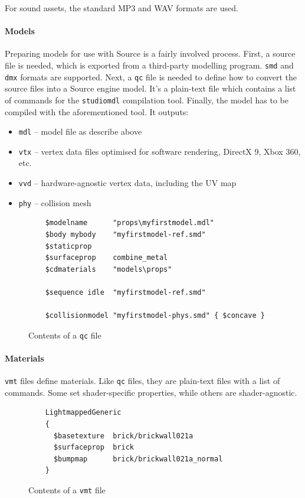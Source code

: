 \documentclass[a4paper, 12pt]{scrartcl}
\begin{document}
For sound assets, the standard MP3 and WAV formats are used.

\paragraph{Models}
Preparing models for use with Source is a fairly involved process. First, a source file is needed, which is exported from a third-party modelling program. \texttt{smd} and \texttt{dmx} formats are supported. Next, a \texttt{qc} file is needed to define how to convert the source files into a Source engine model. It's a plain-text file which contains a list of commands for the \texttt{studiomdl} compilation tool. Finally, the model has to be compiled with the aforementioned tool. It outputs:

\begin{itemize}
  \item \texttt{mdl} -- model file as describe above
  \item \texttt{vtx} -- vertex data files optimised for software rendering, DirectX 9, Xbox 360, etc.
  \item \texttt{vvd} -- hardware-agnostic vertex data, including the UV map
  \item \texttt{phy} -- collision mesh
\end{itemize}

\begin{figure}[!ht]
  \begin{verbatim}
    $modelname      "props\myfirstmodel.mdl"
    $body mybody    "myfirstmodel-ref.smd"
    $staticprop
    $surfaceprop    combine_metal
    $cdmaterials    "models\props"

    $sequence idle  "myfirstmodel-ref.smd"

    $collisionmodel "myfirstmodel-phys.smd" { $concave }
  \end{verbatim}
  \caption{Contents of a \texttt{qc} file}
  \label{fig:source_qc}
\end{figure}

\paragraph{Materials}
\texttt{vmt} files define materials. Like \texttt{qc} files, they are plain-text files with a list of commands. Some set shader-specific properties, while others are shader-agnostic.

\begin{figure}[!ht]
  \begin{verbatim}
    LightmappedGeneric
    {
      $basetexture  brick/brickwall021a
      $surfaceprop  brick
      $bumpmap      brick/brickwall021a_normal
    }
  \end{verbatim}
  \caption{Contents of a \texttt{vmt} file}
  \label{fig:source_vmt}
\end{figure}
\end{document}
